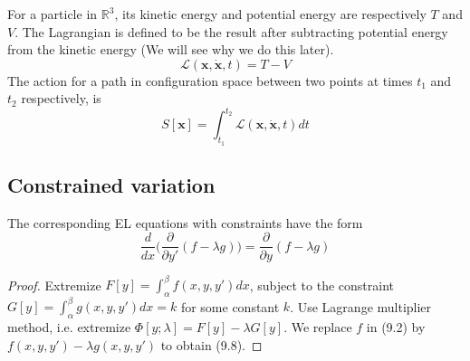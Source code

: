 \documentclass[a4paper]{article}
\begin{document}
\begin{defi}
For a particle in $\mathbb{R}^3$, its kinetic energy and potential energy are respectively $T$ and $V$. The Lagrangian is defined to be the result after subtracting potential energy from the kinetic energy (We will see why we do this later).
\begin{equation}
    \mathcal{L}(\mathbf{x},\mathbf{\dot{x}},t)=T-V\tag{9.6}
\end{equation}
The action for a path in configuration space between two points at times $t_1$ and $t_2$ respectively, is
\begin{equation}
    S[\mathbf{x}]=\int_{t_1}^{t_2}\mathcal{L}(\mathbf{x},\mathbf{\dot{x}},t)dt\tag{9.7}
\end{equation}
\end{defi}
\subsection{Constrained variation}
\begin{prop}
The corresponding EL equations with constraints have the form
\begin{equation}
    \frac{d}{dx}\bigg(\frac{\partial}{\partial y'}(f-\lambda g)\bigg)=\frac{\partial}{\partial y}(f-\lambda g)\tag{9.8}
\end{equation}
\end{prop}
\begin{proof}
Extremize $F[y]=\int_\alpha^\beta f(x,y,y')dx$, subject to the constraint $G[y]=\int_\alpha^\beta g(x,y,y')dx=k$ for some constant $k$. Use Lagrange multiplier method, i.e. extremize $\Phi[y;\lambda]=F[y]-\lambda G[y]$. We replace $f$ in (9.2) by $f(x,y,y')-\lambda g(x,y,y')$ to obtain (9.8).
\end{proof}
\end{document}

